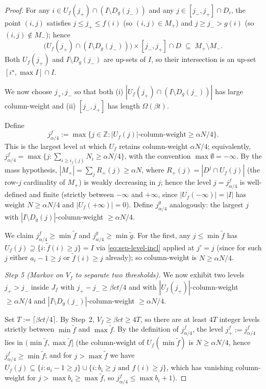 \begin{proof}
For any $i\in U_f(j_+)\cap(I\setminus D_g(j_-))$ and any $j\in[j_-,j_+]\cap D_i$, the
point $(i,j)$ satisfies $j\le j_+\le f(i)$ (so $(i,j)\in M_+$) and $j\ge j_-> g(i)$
(so $(i,j)\notin M_-$); hence
\begin{equation}\label{eq:sep-rect-plus}
  \bigl(U_f(j_+)\cap(I\setminus D_g(j_-))\bigr)\times[j_-,j_+]\cap D\;\subseteq\;M_+\setminus M_-.
\end{equation}
Both $U_f(j_+)$ and $I\setminus D_g(j_-)$ are up-sets of $I$, so their intersection is
an up-set $[i^\star,\max I]\cap I$.

We now choose $j_+,j_-$ so that both (i) $|U_f(j_+)\cap(I\setminus D_g(j_-))|$ has
large column-weight and (ii) $[j_-,j_+]$ has length $\Omega(\beta t)$.

Define
\[
  j^{f}_{\alpha/4}:=\max\bigl\{j\in\mathbb Z:|U_f(j)|\text{-column-weight}\ge\alpha N/4\bigr\}.
\]
This is the largest level at which $U_f$ retains column-weight $\alpha N/4$; equivalently,
$j^f_{\alpha/4}=\max\{j:\sum_{i\ge i_f(j)}N_i\ge\alpha N/4\}$, with the convention
$\max\emptyset=-\infty$. By the mass hypothesis,
$|M_+|=\sum_j R_+(j)\ge\alpha N$, where $R_+(j)=|D^j\cap U_f(j)|$ (the row-$j$
cardinality of $M_+$) is weakly decreasing in $j$; hence the level $j=j^f_{\alpha/4}$
is well-defined and finite (strictly between $-\infty$ and $+\infty$, since
$|U_f(-\infty)|=|I|$ has weight $N\ge\alpha N/4$ and $|U_f(+\infty)|=0$). Define
$j^g_{\alpha/4}$ analogously: the largest $j$ with
$|I\setminus D_g(j)|$-column-weight $\ge\alpha N/4$.

We claim $j^f_{\alpha/4}\ge\min\tilde f$ and $j^g_{\alpha/4}\ge\min\tilde g$. For the
first, any $j\le\min\tilde f$ has $U_f(j)\supseteq\{i:\tilde f(i)\ge j\}=I$ via
\eqref{eq:sep-level-incl} applied at $j'=j$ (since for such $j$ either $a_i-1\ge j$
or $\tilde f(i)\ge j$ already); so column-weight is $N\ge\alpha N/4$.

\smallskip
\emph{Step 5 (Markov on $V_f$ to separate two thresholds).}
We now exhibit two levels $j_+ > j_-$ inside $J_f$ with $j_+-j_-\ge\beta c t/4$ and
with $|U_f(j_+)|$-column-weight $\ge\alpha N/4$ and $|I\setminus D_g(j_-)|$-column-weight
$\ge\alpha N/4$.

Set $T:=\lceil\beta ct/4\rceil$. By Step~2, $V_f\ge\beta ct\ge 4T$, so there are at
least $4T$ integer levels strictly between $\min\tilde f$ and $\max\tilde f$. By the
definition of $j^f_{\alpha/4}$, the level $j_+^f:=j^f_{\alpha/4}$ lies in
$(\min\tilde f,\max\tilde f]$ (the column-weight of $U_f(\min\tilde f)$ is
$N\ge\alpha N/4$, hence $j^f_{\alpha/4}\ge\min\tilde f$; and for $j>\max\tilde f$ we
have $U_f(j)\subseteq\{i:a_i-1\ge j\}\cup\{i:b_i\ge j\text{ and }f(i)\ge j\}$, which
has vanishing column-weight for $j>\max b_i\ge\max\tilde f$, so $j^f_{\alpha/4}\le\max b_i+1$).


\end{proof}
